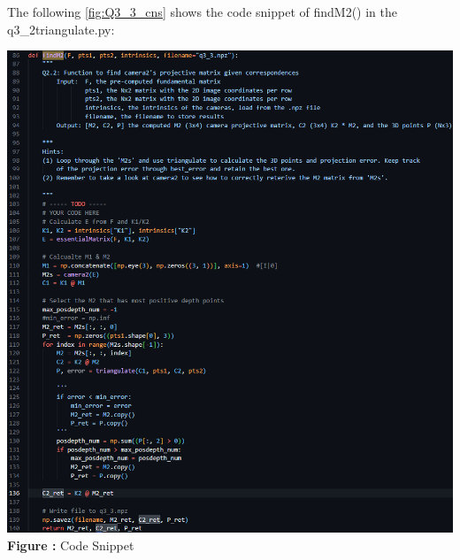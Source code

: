 \begin{your_solution}[title=Q3.3,height=14.5cm,width=\linewidth]
	The following \autoref{fig:Q3_3_cns} shows the code snippet of findM2() in the q3\_2triangulate.py:
	\newline
	
	\begin{minipage}{1\linewidth}
		\centering
		\hspace{0.12\linewidth} 
		\includegraphics[width=0.7\linewidth]{../Q3_3_cns.png}  %
		\newline
		\textbf{Figure \thefigure:} Code Snippet %
		\label{fig:Q3_3_cns}  %
	\end{minipage}
\end{your_solution}

